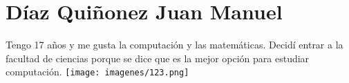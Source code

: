 \chapter{Díaz Quiñonez Juan Manuel}
Tengo 17 años y me gusta la computación y las matemáticas. Decidí entrar a la facultad de ciencias porque se dice que es la mejor opción para estudiar computación.
\texttt{[image: imagenes/123.png]}


